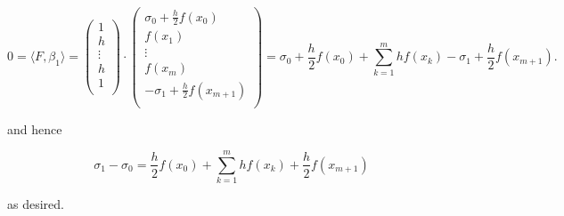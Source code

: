 \begin{solution}
    \[
    0 = \langle F, \beta_1 \rangle = \begin{pmatrix} 
             1 \\
             h \\
        \vdots \\
             h \\
             1 \\
    \end{pmatrix} \cdot
    \begin{pmatrix} 
             \sigma_0 + \frac{h}{2} f(x_0) \\
                                    f(x_1) \\
                                    \vdots \\
                                    f(x_m) \\
        -\sigma_1 + \frac{h}{2} f(x_{m+1}) \\
    \end{pmatrix} = \sigma_0 + \frac{h}{2} f(x_0) + \sum\limits_{k=1}^{m}{h f(x_k)} - \sigma_1 + \frac{h}{2} f(x_{m+1}).
    \]

    and hence

    $$
    \sigma_1 - \sigma_0 = \frac{h}{2} f(x_0) + \sum\limits_{k=1}^{m}{h f(x_k)} + \frac{h}{2} f(x_{m+1})
    $$

    as desired.
\end{solution}